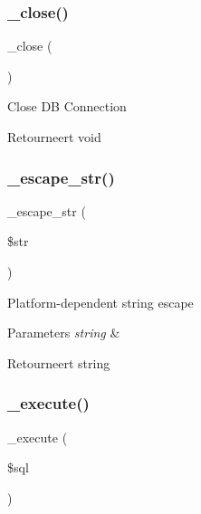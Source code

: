 \subsubsection{\texorpdfstring{\_close()}{\_close()}}
{\footnotesize\ttfamily \+\_\+close (\begin{DoxyParamCaption}{ }\end{DoxyParamCaption})\hspace{0.3cm}{\ttfamily [protected]}}

Close DB Connection

\begin{DoxyReturn}{Retourneert}
void 
\end{DoxyReturn}
\mbox{\label{class_c_i___d_b__sqlite3__driver_af8ef0237bfcdb19215b63fff769e7a55}} 
\subsubsection{\texorpdfstring{\_escape\_str()}{\_escape\_str()}}
{\footnotesize\ttfamily \+\_\+escape\+\_\+str (\begin{DoxyParamCaption}\item[{}]{\$str }\end{DoxyParamCaption})\hspace{0.3cm}{\ttfamily [protected]}}

Platform-\/dependent string escape


\begin{DoxyParams}{Parameters}
{\em string} & \\
\hline
\end{DoxyParams}
\begin{DoxyReturn}{Retourneert}
string 
\end{DoxyReturn}
\mbox{\label{class_c_i___d_b__sqlite3__driver_a114ab675d89bf8324a41785fb475e86d}} 
\subsubsection{\texorpdfstring{\_execute()}{\_execute()}}
{\footnotesize\ttfamily \+\_\+execute (\begin{DoxyParamCaption}\item[{}]{\$sql }\end{DoxyParamCaption})\hspace{0.3cm}{\ttfamily [protected]}}

